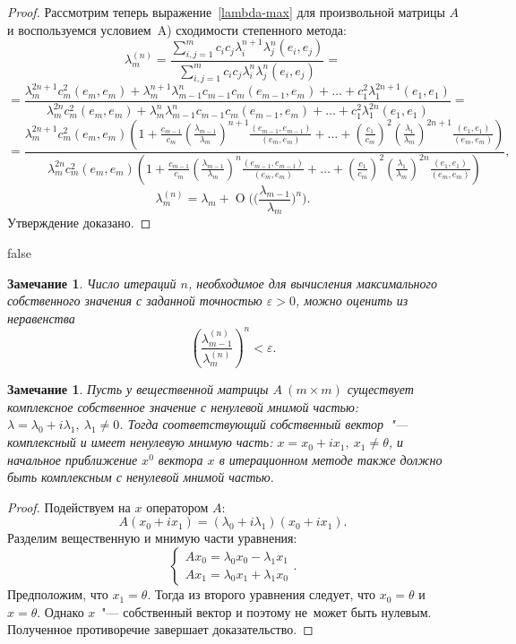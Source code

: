 \documentclass[11pt,a4paper,twoside]{report}
\numberwithin{equation}{section}
\theoremstyle{definition}
\theoremstyle{plain}
\newtheorem{note}{Замечание}[section]
\newtheorem*{note*}{Замечание}
\begin{document}
\begin{proof}
Рассмотрим теперь выражение~\eqref{lambda-max} для произвольной матрицы $A$
и воспользуемся условием~A) сходимости степенного метода:
%
$$
    \lambda_m^{(n)} = \frac{\sum\limits_{i,j=1}^m c_ic_j\lambda_i^{n+1}
    \lambda_j^n(e_i,e_j)}{\sum\limits_{i,j=1}^m c_ic_j\lambda_i^n
    \lambda_j^n(e_i,e_j)}=
$$
%
%
$$
    =\frac{\lambda_m^{2n+1}c_m^2(e_m,e_m)+\lambda^{n+1}_m\lambda_{m-1}^nc_{m-1}
    c_m(e_{m-1},e_m)+\ldots+c_1^2\lambda_1^{2n+1}(e_1,e_1)}
    {\lambda_m^{2n}c_m^2(e_m,e_m)+\lambda^{n}_m\lambda_{m-1}^nc_{m-1}
    c_m(e_{m-1},e_m)+\ldots+c_1^2\lambda_1^{2n}(e_1,e_1)}=
$$
%
%
$$
    =\frac{\lambda_m^{2n+1}c_m^2(e_m,e_m)
    \left(1+\frac{c_{m-1}}{c_m}\left(\frac{\lambda_{m-1}}{\lambda_m}\right)^{n+1}
    \frac{(e_{m-1},e_{m-1})}{(e_m,e_m)}+\ldots+
    \left(\frac{c_1}{c_m}\right)^2\left(\frac{\lambda_1}{\lambda_m}\right)^{2n+1}
    \frac{(e_1,e_1)}{(e_m,e_m)}
    \right)}
    {\lambda_m^{2n}c_m^2(e_m,e_m)
    \left(1+\frac{c_{m-1}}{c_m}\left(\frac{\lambda_{m-1}}{\lambda_m}\right)^{n}
    \frac{(e_{m-1},e_{m-1})}{(e_m,e_m)}+\ldots+
    \left(\frac{c_1}{c_m}\right)^2\left(\frac{\lambda_1}{\lambda_m}\right)^{2n}
    \frac{(e_1,e_1)}{(e_m,e_m)}
    \right)},
$$
%
%
$$
    \lambda_m^{(n)}=\lambda_m + \operatorname{O}\Biggl(\biggl(\frac{\lambda_{m-1}}
    {\lambda_m}\biggr)^n\Biggr).
$$
%
Утверждение доказано.
\end{proof}
%
%
\ifx false
\begin{note}
Число итераций $n$, необходимое для вычисления максимального собственного значения с
заданной точностью $\varepsilon>0$, можно оценить из неравенства
%
$$
    \left(\frac{\lambda_{m-1}^{(n)}}{\lambda_m^{(n)}}\right)^n <\varepsilon.
$$
%
\end{note}
%
\fi
%
\begin{note*}
Пусть у вещественной матрицы $A~(m\times m)$ существует комплексное собственное
значение с ненулевой мнимой частью:
$\lambda = \lambda_0 + i \lambda_1,~\lambda_1 \ne 0$. Тогда соответствующий
собственный вектор~"--- комплексный и имеет ненулевую мнимую часть:
$x=x_0+ix_1,~x_1\ne\theta$, и начальное приближение $x^0$ вектора $x$ в итерационном
методе также должно быть комплексным с ненулевой мнимой частью.
\end{note*}
%
\begin{proof}
    Подействуем на $x$ оператором $A$:
    $$
        A(x_0 + i x_1) = (\lambda_0 + i\lambda_1)(x_0 + i x_1).
    $$
    Разделим вещественную и мнимую части уравнения:
    $$
    \begin{cases}
        Ax_0 = \lambda_0 x_0 - \lambda_1 x_1\\
        Ax_1 = \lambda_0 x_1 + \lambda_1 x_0
    \end{cases}.
    $$
    Предположим, что $x_1 = \theta$. Тогда из второго уравнения следует, что
    $x_0 = \theta$ и $x = \theta$. Однако $x$~"--- собственный вектор и поэтому
    не~может быть нулевым. Полученное противоречие завершает доказательство.
\end{proof}
%
\end{document}
